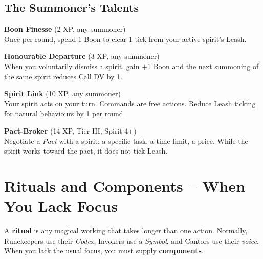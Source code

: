\documentclass[10pt,a5paper]{book}
\begin{document}
\section{The Summoner's Talents}

\begin{tcolorbox}[colback=green!5, colframe=green!70]
\textbf{Boon Finesse} (2 XP, any summoner) \\
Once per round, spend 1 Boon to clear 1 tick from your active spirit's Leash.
\end{tcolorbox}

\begin{tcolorbox}[colback=green!5, colframe=green!70]
\textbf{Honourable Departure} (3 XP, any summoner) \\
When you voluntarily dismiss a spirit, gain +1 Boon and the next summoning of the same spirit reduces Call DV by 1.
\end{tcolorbox}

\begin{tcolorbox}[colback=blue!5, colframe=blue!70]
\textbf{Spirit Link} (10 XP, any summoner) \\
Your spirit acts on your turn. Commands are free actions. Reduce Leash ticking for natural behaviours by 1 per round.
\end{tcolorbox}

\begin{tcolorbox}[colback=red!5, colframe=red!70]
\textbf{Pact-Broker} (14 XP, Tier III, Spirit 4+) \\
Negotiate a \textit{Pact} with a spirit: a specific task, a time limit, a price. While the spirit works toward the pact, it does not tick Leash.
\end{tcolorbox}

\clearpage


\chapter{Rituals and Components -- When You Lack Focus}

A \textbf{ritual} is any magical working that takes longer than one action. Normally, Runekeepers use their \textit{Codex}, Invokers use a \textit{Symbol}, and Cantors use their \textit{voice}. When you lack the usual focus, you must supply \textbf{components}.
\end{document}
